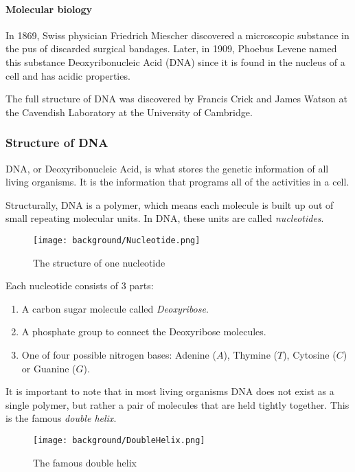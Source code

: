 \paragraph{Molecular biology}

In 1869, Swiss physician Friedrich Miescher discovered a microscopic substance in the pus of discarded surgical bandages. Later, in 1909, Phoebus Levene named this substance Deoxyribonucleic Acid (DNA) since it is found in the nucleus of a cell and has acidic properties.

The full structure of DNA was discovered by Francis Crick and James Watson at the Cavendish Laboratory at the University of Cambridge.

\subsubsection{Structure of DNA}

DNA, or Deoxyribonucleic Acid, is what stores the genetic information of all living organisms. It is the information that programs all of the activities in a cell.

Structurally, DNA is a polymer, which means each molecule is built up out of small repeating molecular units. In DNA, these units are called \emph{nucleotides}.

\begin{figure}[H]
	\centering
	\texttt{[image: background/Nucleotide.png]}
	\caption{The structure of one nucleotide}
	\label{fig:nucleotide}
\end{figure}

Each nucleotide consists of 3 parts:

\begin{enumerate}
	\item A carbon sugar molecule called \emph{Deoxyribose}.
	\item A phosphate group to connect the Deoxyribose molecules. 
	\item One of four possible nitrogen bases: Adenine ($A$), Thymine ($T$), Cytosine ($C$) or Guanine ($G$).
\end{enumerate}

It is important to note that in most living organisms DNA does not exist as a single polymer, but rather a pair of molecules that are held tightly together. This is the famous \emph{double helix}.

\begin{figure}[H]
	\centering
	\texttt{[image: background/DoubleHelix.png]}
	\caption{The famous double helix}
	\label{fig:doubleHelix}
\end{figure}

